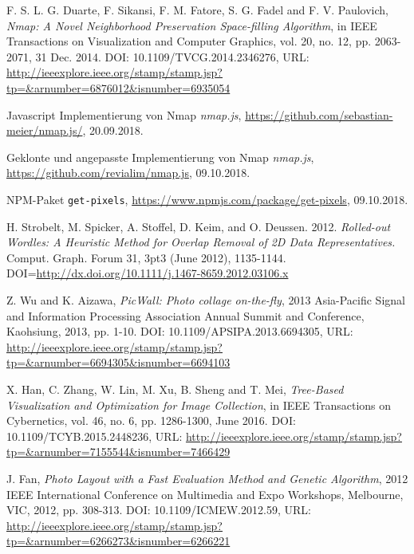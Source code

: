 \documentclass[12pt, ngerman, utf8]{article}
\begin{document}
\begin{thebibliography}{9}
  
F. S. L. G. Duarte, F. Sikansi, F. M. Fatore, S. G. Fadel and F. V. Paulovich, 
\textit{Nmap: A Novel Neighborhood Preservation Space-filling Algorithm}, in IEEE Transactions on Visualization and Computer Graphics, vol. 20, no. 12, pp. 2063-2071, 31 Dec. 2014.
DOI: 10.1109/TVCG.2014.2346276,
URL: \url{http://ieeexplore.ieee.org/stamp/stamp.jsp?tp=&arnumber=6876012&isnumber=6935054}

 Javascript Implementierung von Nmap \textit{nmap.js}, \url{https://github.com/sebastian-meier/nmap.js/}, 20.09.2018.

 Geklonte und angepasste Implementierung von Nmap \textit{nmap.js}, \url{https://github.com/revialim/nmap.js}, 09.10.2018.

 NPM-Paket \texttt{get-pixels}, \url{https://www.npmjs.com/package/get-pixels}, 09.10.2018.

 H. Strobelt, M. Spicker, A. Stoffel, D. Keim, and O. Deussen. 2012. \textit{Rolled-out Wordles: A Heuristic Method for Overlap Removal of 2D Data Representatives.} Comput. Graph. Forum 31, 3pt3 (June 2012), 1135-1144. DOI=\url{http://dx.doi.org/10.1111/j.1467-8659.2012.03106.x}

 Z. Wu and K. Aizawa, \textit{PicWall: Photo collage on-the-fly}, 2013 Asia-Pacific Signal and Information Processing Association Annual Summit and Conference, Kaohsiung, 2013, pp. 1-10.
DOI: 10.1109/APSIPA.2013.6694305,
URL: \url{http://ieeexplore.ieee.org/stamp/stamp.jsp?tp=&arnumber=6694305&isnumber=6694103}

 X. Han, C. Zhang, W. Lin, M. Xu, B. Sheng and T. Mei, \textit{Tree-Based Visualization and Optimization for Image Collection}, in IEEE Transactions on Cybernetics, vol. 46, no. 6, pp. 1286-1300, June 2016.
DOI: 10.1109/TCYB.2015.2448236,
URL: \url{http://ieeexplore.ieee.org/stamp/stamp.jsp?tp=&arnumber=7155544&isnumber=7466429}

 J. Fan, \textit{Photo Layout with a Fast Evaluation Method and Genetic Algorithm}, 2012 IEEE International Conference on Multimedia and Expo Workshops, Melbourne, VIC, 2012, pp. 308-313.
DOI: 10.1109/ICMEW.2012.59,
URL: \url{http://ieeexplore.ieee.org/stamp/stamp.jsp?tp=&arnumber=6266273&isnumber=6266221}


\end{thebibliography}
\end{document}
